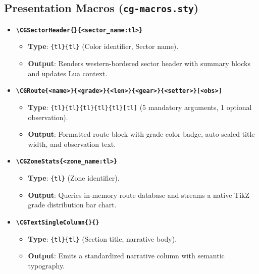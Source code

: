 \subsection{Presentation Macros (\texttt{cg-macros.sty})}
\begin{sloppypar}
{\small
\begin{itemize}
    \item \textbf{\texttt{\textbackslash CGSectorHeader\{<color:tl>\}\{<sector\_name:tl>\}}}
    \begin{itemize}
        \item \textbf{Type}: \texttt{\{tl\}\{tl\}} (Color identifier, Sector name).
        \item \textbf{Output}: Renders western-bordered sector header with summary blocks and updates Lua context.
    \end{itemize}

    \item \textbf{\texttt{\textbackslash CGRoute\{<name>\}\{<grade>\}\{<len>\}\{<gear>\}\{<setter>\}[<obs>]}}
    \begin{itemize}
        \item \textbf{Type}: \texttt{\{tl\}\{tl\}\{tl\}\{tl\}\{tl\}[tl]} (5 mandatory arguments, 1 optional observation).
        \item \textbf{Output}: Formatted route block with grade color badge, auto-scaled title width, and observation text.
    \end{itemize}

    \item \textbf{\texttt{\textbackslash CGZoneStats\{<zone\_name:tl>\}}}
    \begin{itemize}
        \item \textbf{Type}: \texttt{\{tl\}} (Zone identifier).
        \item \textbf{Output}: Queries in-memory route database and streams a native TikZ grade distribution bar chart.
    \end{itemize}

    \item \textbf{\texttt{\textbackslash CGTextSingleColumn\{<title:tl>\}\{<body:tl>\}}}
    \begin{itemize}
        \item \textbf{Type}: \texttt{\{tl\}\{tl\}} (Section title, narrative body).
        \item \textbf{Output}: Emits a standardized narrative column with semantic typography.
    \end{itemize}
\end{itemize}
}
\end{sloppypar}

